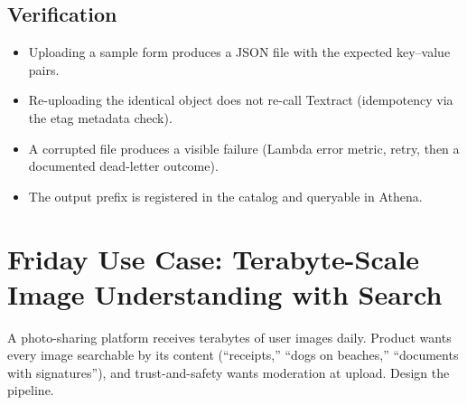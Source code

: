 \subsection*{Verification}
\begin{itemize}
    \item Uploading a sample form produces a JSON file with the expected key--value pairs.
    \item Re-uploading the identical object does not re-call Textract (idempotency via the etag metadata check).
    \item A corrupted file produces a visible failure (Lambda error metric, retry, then a documented dead-letter outcome).
    \item The output prefix is registered in the catalog and queryable in Athena.
\end{itemize}

\section{Friday Use Case: Terabyte-Scale Image Understanding with Search}
A photo-sharing platform receives terabytes of user images daily. Product wants every image searchable by its content (``receipts,'' ``dogs on beaches,'' ``documents with signatures''), and trust-and-safety wants moderation at upload. Design the pipeline.


